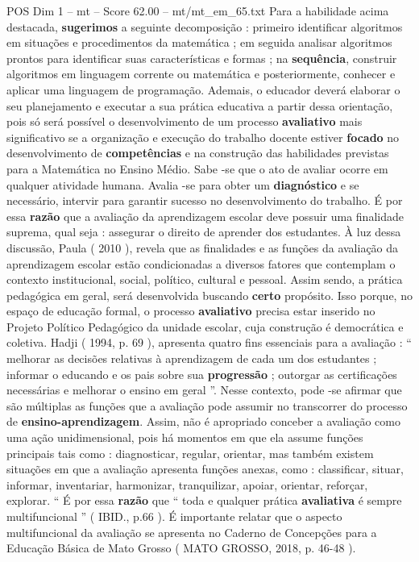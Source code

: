 \begin{textsample}{POS Dim 1 – mt – Score 62.00 – mt/mt\_em\_65.txt}
Para a habilidade acima destacada, \textbf{sugerimos} a seguinte decomposição : primeiro identificar algoritmos em situações e procedimentos da matemática ; em seguida analisar algoritmos prontos para identificar suas características e formas ; na \textbf{sequência}, construir algoritmos em linguagem corrente ou matemática e posteriormente, conhecer e aplicar uma linguagem de programação.
Ademais, o educador deverá elaborar o seu planejamento e executar a sua prática educativa a partir dessa orientação, pois só será possível o desenvolvimento de um processo \textbf{avaliativo} mais significativo se a organização e execução do trabalho docente estiver \textbf{focado} no desenvolvimento de \textbf{competências} e na construção das habilidades previstas para a Matemática no Ensino Médio.
Sabe -se que o ato de avaliar ocorre em qualquer atividade humana.
Avalia -se para obter um \textbf{diagnóstico} e se necessário, intervir para garantir sucesso no desenvolvimento do trabalho.
É por essa \textbf{razão} que a avaliação da aprendizagem escolar deve possuir uma finalidade suprema, qual seja : assegurar o direito de aprender dos estudantes.
À luz dessa discussão, Paula ( 2010 ), revela que as finalidades e as funções da avaliação da aprendizagem escolar estão condicionadas a diversos fatores que contemplam o contexto institucional, social, político, cultural e pessoal.
Assim sendo, a prática pedagógica em geral, será desenvolvida buscando \textbf{certo} propósito.
Isso porque, no espaço de educação formal, o processo \textbf{avaliativo} precisa estar inserido no Projeto Político Pedagógico da unidade escolar, cuja construção é democrática e coletiva.
Hadji ( 1994, p. 69 ), apresenta quatro fins essenciais para a avaliação : “ melhorar as decisões relativas à aprendizagem de cada um dos estudantes ; informar o educando e os pais sobre sua \textbf{progressão} ; outorgar as certificações necessárias e melhorar o ensino em geral ”.
Nesse contexto, pode -se afirmar que são múltiplas as funções que a avaliação pode assumir no transcorrer do processo de \textbf{ensino-aprendizagem}.
Assim, não é apropriado conceber a avaliação como uma ação unidimensional, pois há momentos em que ela assume funções principais tais como : diagnosticar, regular, orientar, mas também existem situações em que a avaliação apresenta funções anexas, como : classificar, situar, informar, inventariar, harmonizar, tranquilizar, apoiar, orientar, reforçar, explorar. “ É por essa \textbf{razão} que “ toda e qualquer prática \textbf{avaliativa} é sempre multifuncional ” ( IBID., p.66 ).
É importante relatar que o aspecto multifuncional da avaliação se apresenta no Caderno de Concepções para a Educação Básica de Mato Grosso ( MATO GROSSO, 2018, p. 46-48 ).

\end{textsample}
